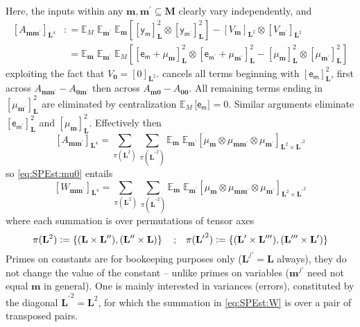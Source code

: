 \documentclass[preprint,12pt]{elsarticle}
\newcommand*{\M}[1]{\ensuremath{#1}\xspace}
\newcommand*{\x}{\times}
\newcommand*{\mi}[1]{\mathbf{#1}}
\newcommand*{\rv}[1]{\mathsf{#1}}
\newcommand*{\te}[2][]{\left\lbrack{#2}\right\rbrack_{#1}}
\newcommand*{\tte}[2][]{\lbrack{#2}\rbrack_{#1}}
\newcommand*{\deq}{\M{\mathrel{\mathop:}=}}
\newcommand{\T}[1]{\text{#1}}
\newcommand*{\QT}[2][]{\M{\quad\T{#2}\ifthenelse{\equal{#1}{}}{\quad}{#1}}}
\newcommand*{\ev}[3][]{\mathbb{E}_{#3}^{#1}\!\left\lbrack{#2}\right\rbrack}
\newcommand*{\evt}[3][]{\mathbb{E}_{#3}^{#1}\!#2}
\newcommand*{\set}[1]{\M{\left\lbrace{#1}\right\rbrace}}
\begin{document}
    Here, the inputs within any $\mi{m},\mi{m^{\prime}}\subseteq\mi{M}$ clearly vary independently, and
    \begin{equation*}
        \begin{aligned}
            \te[\mi{L}^4]{A_{\mi{mm^{\prime}}}}
            &\deq \evt{\;\evt{\;\ev{\te[\mi{L}]{\rv{y_{m}}}^{2} \otimes \te[\mi{L}]{\rv{y_{m^{\prime}}}}^{2}}{\mi{m}}}{\mi{m^{\prime}}}}{M} - \te[\mi{L}^2]{V_{\mi{m}}}\otimes \te[\mi{L}^2]{V_{\mi{m^{\prime}}}} \\
            &\phantom{:}= \evt{\;\evt{\;\ev{
                \te[\mi{L}]{\rv{e_{m}}+\mu_{\mi{m}}}^{2} \otimes \te[\mi{L}]{\rv{e_{m^{\prime}}}+ \mu_{\mi{m^{\prime}}}}^{2} - 
                \te[\mi{L}]{\mu_{\mi{m}}}^{2} \otimes \te[\mi{L}]{\mu_{\mi{m^{\prime}}}}^{2}
            }{M}}{\mi{m^{\prime}}}}{\mi{m}}
        \end{aligned}
    \end{equation*}
    exploiting the fact that $V_{\mi{0}} = \te[\mi{L}^2]{0}$.  cancels all terms beginning with $\te[\mi{L}]{\rv{e_{m}}}^{2}$, first across $A_{\mi{mm^{\prime}}}-A_{\mi{0m^{\prime}}}$ then across $A_{\mi{m0}}-A_{\mi{00}}$. All remaining terms ending in $\te[\mi{L}]{\mu_{\mi{m^{\prime}}}}^{2}$ are eliminated by centralization $\evt{\,\tte[]{\rv{e_{m}}}}{M} = 0$.
    Similar arguments eliminate $\te[\mi{L}]{\rv{e_{m^{\prime}}}}^{2}$ and $\te[\mi{L}]{\mu_{\mi{m}}}^{2}$.
    Effectively then
    \begin{equation*}
        \te[\mi{L}^4]{A_{\mi{mm^{\prime}}}} = \sum_{\pi(\mi{L}^{2})} \sum_{\pi(\mi{L^{\prime}}^{2})}
        \evt{\;\evt{\te[\mi{L}^{2} \x \mi{L^{\prime}}^{2}]{\mu_{\mi{m}} \otimes \mu_{\mi{mm^{\prime}}} \otimes \mu_{\mi{m^{\prime}}}}}{\mi{m^{\prime}}}}{\mi{m}}
    \end{equation*}
    so \cref{eq:SPEst:mu0} entails
    \begin{equation}\label{eq:SPEst:W}
        \te[\mi{L}^4]{W_{\mi{mm^{\prime}}}} = \sum_{\pi(\mi{L}^{2})} \sum_{\pi(\mi{L^{\prime}}^{2})}
        \evt{\;\evt{\te[\mi{L}^{2} \x \mi{L^{\prime}}^{2}]{\mu_{\mi{m}} \otimes \mu_{\mi{mm^{\prime}}} \otimes \mu_{\mi{m^{\prime}}}}}{\mi{m^{\prime}}}}{\mi{m}}
    \end{equation}
    where each summation is over permutations of tensor axes
    \begin{equation*}
        \pi(\mi{L}^{2}) \deq \set{(\mi{L}\x\mi{L^{\prime\prime}}), (\mi{L^{\prime\prime}}\x\mi{L})} \QT{;} \pi(\mi{L^{\prime}}^{2}) \deq \set{(\mi{L^{\prime}}\x\mi{L^{\prime\prime\prime}}), (\mi{L^{\prime\prime\prime}}\x\mi{L^{\prime}})}
    \end{equation*}
    Primes on constants are for bookeeping purposes only ($\mi{L}^{j\prime} = \mi{L}$ always), they do not change the value of the constant -- unlike primes on variables ($\mi{m}^{j\prime}$ need not equal $\mi{m}$ in general). One is mainly interested in variances (errors), constituted by the diagonal $\mi{L^{\prime}}^{2}=\mi{L}^{2}$, for which the summation in \cref{eq:SPEst:W} is over a pair of transposed pairs.
\end{document}
